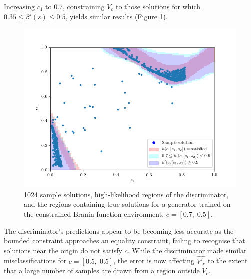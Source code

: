 \documentclass[../../main.tex]{subfiles}
\begin{document}
Increasing $c_1$ to $0.7$, constraining $V_c$ to those solutions for which $0.35\le\beta'(s)\le0.5$, yields similar results (Figure \ref{fig:equality07}).
\begin{figure}[H]
    \begin{center}
    \includegraphics[width=\textwidth]{equality07}
    \caption{
        1024 sample solutions, high-likelihood regions of the discriminator, and the regions containing true solutions for a generator trained on the constrained Branin function environment.
        $c=[0.7,\;0.5]$.
    }
    \label{fig:equality07}
    \end{center}
\end{figure}
The discriminator's predictions appear to be becoming less accurate as the bounded constraint approaches an equality constraint, failing to recognise that solutions near the origin do not satisfy $c$.
While the discriminator made similar misclassifications for $c=[0.5,\;0.5]$, the error is now affecting $\hat{V'_c}$ to the extent that a large number of samples are drawn from a region outside $V_c$.
\end{document}
